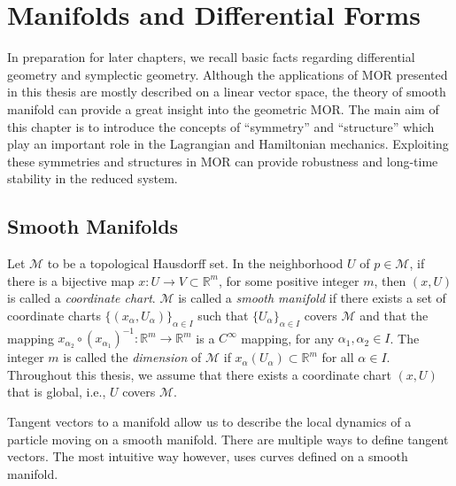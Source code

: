 \chapter{Manifolds and Differential Forms}

In preparation for later chapters, we recall basic facts regarding differential geometry and symplectic geometry. Although the applications of MOR presented in this thesis are mostly described on a linear vector space, the theory of smooth manifold can provide a great insight into the geometric MOR. The main aim of this chapter is to introduce the concepts of ``symmetry'' and ``structure'' which play an important role in the Lagrangian and Hamiltonian mechanics. Exploiting these symmetries and structures in MOR can provide robustness and long-time stability in the reduced system.

\section{Smooth Manifolds}
Let $\mathcal M$ to be a topological Hausdorff \cite{friedman1970foundations} set. In the neighborhood $U$ of $p\in \mathcal M$, if there is a bijective map $x:U\to V\subset \mathbb R^{m}$, for some positive integer $m$, then $(x,U)$ is called a \emph{coordinate chart}. $\mathcal M$ is called a \emph{smooth manifold} if there exists a set of coordinate charts $\{(x_{\alpha},U_{\alpha})\}_{\alpha\in I}$ such that $\{U_{\alpha}\}_{\alpha\in I}$ covers $\mathcal M$ and that the mapping $x_{\alpha_2}\circ (x_{\alpha_1})^{-1}:\mathbb R^{m} \to \mathbb R^{m}$ is a $C^{\infty}$ mapping, for any $\alpha_1,\alpha_2\in I$. The integer $m$ is called the \emph{dimension} of $\mathcal M$ if $x_{\alpha}(U_{\alpha}) \subset \mathbb R^{m}$ for all $\alpha \in I$. Throughout this thesis, we assume that there exists a coordinate chart $(x,U)$ that is global, i.e., $U$ covers $\mathcal M$.

Tangent vectors to a manifold allow us to describe the local dynamics of a particle moving on a smooth manifold. There are multiple ways to define tangent vectors. The most intuitive way however, uses curves defined on a smooth manifold.

